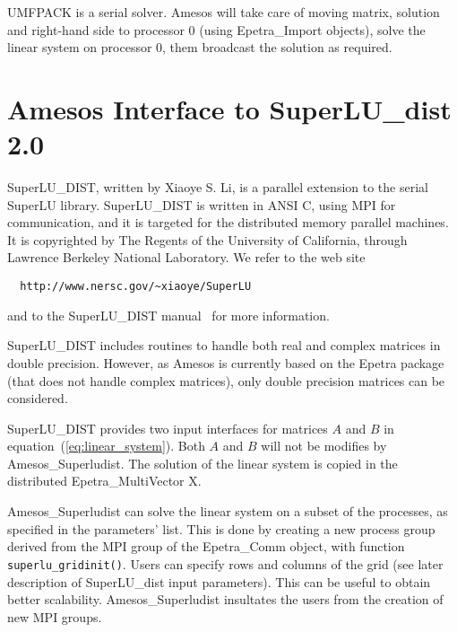 \documentclass[11pt]{SANDreport}
\begin{document}
UMFPACK is a serial solver. Amesos will take care of moving matrix,
solution and right-hand side to processor 0 (using Epetra\_Import
objects), solve the linear system on processor 0, them broadcast the
solution as required.




\section{Amesos Interface to SuperLU\_dist 2.0}
\label{sec:superludist}

SuperLU\_DIST, written by Xiaoye S. Li, is a parallel extension to the
serial SuperLU library.  SuperLU\_DIST is written in ANSI C, using MPI
for communication, and it is targeted for the distributed memory
parallel machines. It is copyrighted by The Regents of the University of
California, through Lawrence Berkeley National Laboratory.  We refer to
the web site
\begin{verbatim}
  http://www.nersc.gov/~xiaoye/SuperLU
\end{verbatim}
and to the SuperLU\_DIST manual~\cite{superlu-manual} for more
information.

SuperLU\_DIST includes routines to handle both real and complex matrices
in double precision. However, as Amesos is currently based on the Epetra
package (that does not handle complex matrices), only double precision
matrices can be considered.

SuperLU\_DIST provides two input interfaces for matrices $A$ and $B$ in
equation~(\ref{eq:linear_system}).  Both $A$ and $B$ will not be
modifies by Amesos\_Superludist. The solution of the linear system is
copied in the distributed Epetra\_MultiVector X.

Amesos\_Superludist can solve the linear system on a subset of the
processes, as specified in the parameters' list. This is done by
creating a new process group derived from the MPI group of the
Epetra\_Comm object, with function \verb!superlu_gridinit()!. Users can
specify rows and columns of the grid (see later description of
SuperLU\_dist input parameters). This can be useful to obtain better
scalability. Amesos\_Superludist insultates the users from the creation
of new MPI groups.
\end{document}
